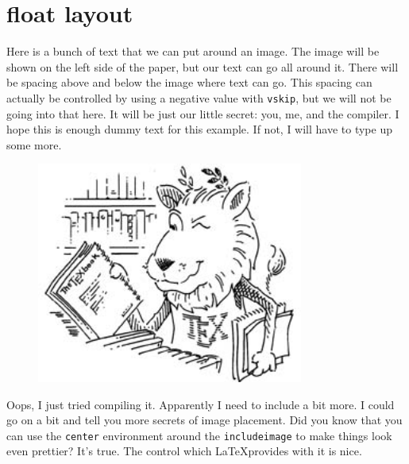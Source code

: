 \documentclass[DIV13,a4paper]{scrartcl}
\begin{document}
	\clearpage
	
	\section{float layout}
	\begin{minipage}[c]{0.7\textwidth}
		  Here is a bunch of text that we can put around an image.  The image will be shown on the left
		side of the paper, but our text can go all around it.  There will be spacing above and below the
		image where text can go.  This spacing can actually be controlled by using a negative value with
		\texttt{vskip}, but we will not be going into that here.  It will be just our little secret: you,
		me, and the compiler.  I hope this is enough dummy text for this example.  If not, I will have to
		type up some more.
		\begin{figure}
			\centering
			\includegraphics[width=0.78\textwidth]{lion.png}
		\end{figure}
		Oops, I just tried compiling it.  Apparently I need to include a bit more.  I could go on a bit
		and tell you more secrets of image placement.  Did you know that you can use the \texttt{center}
		environment around the \texttt{includeimage} to make things look even prettier?  It's true.  The
		control which \LaTeX provides with it is nice.
	\end{minipage}
\end{document}
